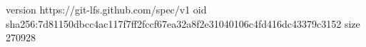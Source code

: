 version https://git-lfs.github.com/spec/v1
oid sha256:7d81150dbcc4ac117f7ff2fccf67ea32a8f2e31040106c4fd416dc43379c3152
size 270928
